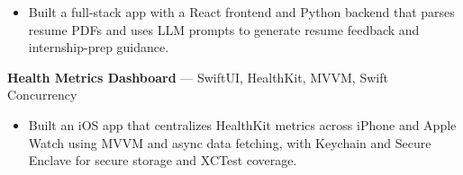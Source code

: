 \documentclass[a4paper,8pt]{extarticle}
\begin{document}
\begin{itemize}
\item Built a full-stack app with a React frontend and Python backend that parses resume PDFs and uses LLM prompts to generate resume feedback and internship-prep guidance.
\end{itemize}

\noindent
\textbf{Health Metrics Dashboard} --- SwiftUI, HealthKit, MVVM, Swift Concurrency

\begin{itemize}
\item Built an iOS app that centralizes HealthKit metrics across iPhone and Apple Watch using MVVM and async data fetching, with Keychain and Secure Enclave for secure storage and XCTest coverage.
\end{itemize}
\end{document}
